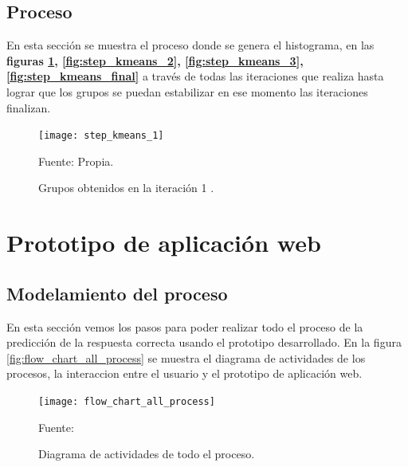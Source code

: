 \subsection{Proceso}

En esta sección se muestra el proceso donde se genera el histograma, en las \textbf{figuras \ref{fig:step_kmeans_1}, \ref{fig:step_kmeans_2}, \ref{fig:step_kmeans_3},\ref{fig:step_kmeans_final}} a través de todas las iteraciones que realiza hasta lograr que los grupos se puedan estabilizar en ese momento las iteraciones finalizan.

\begin{figure}[H]
	\begin{center}
		\texttt{[image: step\_kmeans\_1]}
	\end{center}
	\begin{center}
		\vskip -0.5cm
		\caption{\label{fig:step_kmeans_1}\small{Grupos obtenidos en la iteración 1 .}}
		{\small{Fuente: Propia. }}
	\end{center}
\end{figure}









\section{Prototipo de aplicación web} 

\subsection{Modelamiento del proceso}

En esta sección vemos los pasos para poder realizar todo el proceso de la predicción de la respuesta correcta usando el prototipo desarrollado. En la figura \ref{fig:flow_chart_all_process} se muestra el diagrama de actividades de los procesos, la interaccion entre el usuario y el prototipo de aplicación web.

\begin{figure}[ht]
	\begin{center}
		\texttt{[image: flow\_chart\_all\_process]}
	\end{center}
	\begin{center}
		\vskip -0.5cm
		\caption{\small{Diagrama de actividades de todo el proceso.}}
		{\small{Fuente: }}
	\end{center}
\end{figure}


